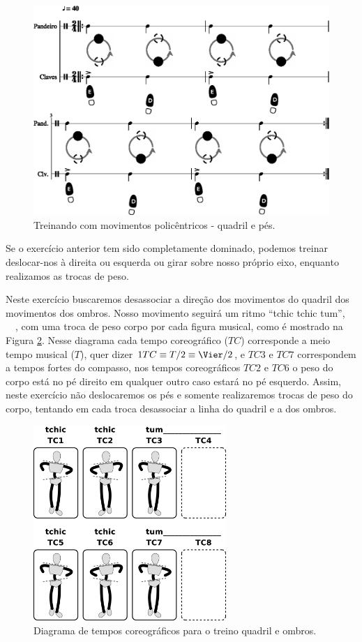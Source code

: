 \begin{figure}[!h]
  \centering
    \includegraphics[width=1.0\textwidth]{chapters/cap-body-isolation/bodycontrol2-1.eps}
\caption{Treinando com movimentos policêntricos - quadril e pés.}
\label{fig:pessoalpesquadril2}
\end{figure}

Se o exercício anterior tem sido completamente dominado, podemos treinar deslocar-nos
à direita ou esquerda ou girar sobre nosso próprio eixo, 
enquanto realizamos as trocas de peso.

\begin{example}
Neste exercício buscaremos desassociar a direção dos movimentos do quadril
dos movimentos dos ombros.
Nosso movimento seguirá um ritmo ``tchic tchic tum'', 
\leftrepeat~\Vier\Acht\Acht~\rightrepeat, 
com uma troca de peso corpo por cada figura musical,
como é mostrado na Figura \ref{fig:pessoalombroquadril1}.
Nesse diagrama cada tempo coreográfico ($TC$)
corresponde a meio tempo musical ($T$), quer dizer $1 TC\equiv  T/2\equiv \Vier/2$,
e $TC3$ e $TC7$ correspondem a tempos fortes do compasso,
nos tempos coreográficos $TC2$ e $TC6$ o peso do corpo está no pé direito em qualquer outro caso estará no pé esquerdo. 
Assim, neste exercício não deslocaremos os pés e
somente realizaremos trocas de peso do corpo, 
tentando em cada troca desassociar a linha do quadril e a dos ombros.

\end{example}

\begin{figure}[!h]
  \centering
  \includegraphics[width=0.65\textwidth]{chapters/cap-body-isolation/postura-ombro2.eps}
\caption{Diagrama de tempos coreográficos para o treino quadril e ombros.}
\label{fig:pessoalombroquadril1}
\end{figure}
